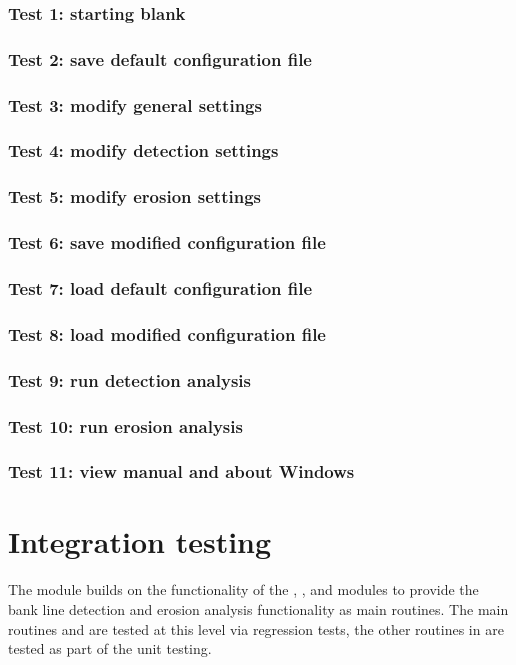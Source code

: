 \subsubsection{Test 1: starting blank}
\subsubsection{Test 2: save default configuration file}
\subsubsection{Test 3: modify general settings}
\subsubsection{Test 4: modify detection settings}
\subsubsection{Test 5: modify erosion settings}
\subsubsection{Test 6: save modified configuration file}
\subsubsection{Test 7: load default configuration file}
\subsubsection{Test 8: load modified configuration file}
\subsubsection{Test 9: run detection analysis}
\subsubsection{Test 10: run erosion analysis}
\subsubsection{Test 11: view manual and about Windows}

\section{Integration testing}

The  module builds on the functionality of the , ,  and  modules to provide the bank line detection and erosion analysis functionality as main routines.
The main routines  and  are tested at this level via regression tests, the other routines in  are tested as part of the unit testing.

